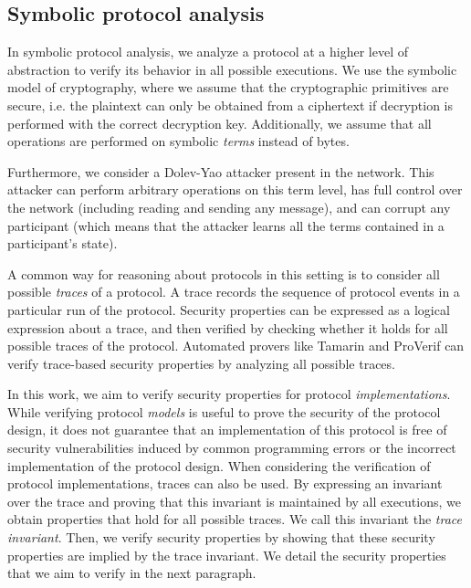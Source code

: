 \subsection{Symbolic protocol analysis}
\label{sec:symbolic-protocol-analysis}

In symbolic protocol analysis, we analyze a protocol at a higher level of abstraction to verify its behavior in all possible executions.
We use the symbolic model of cryptography, where we assume that the cryptographic primitives are secure, i.e. the plaintext can only be obtained from a ciphertext if decryption is performed with the correct decryption key.
Additionally, we assume that all operations are performed on symbolic \emph{terms} instead of bytes.%

Furthermore, we consider a Dolev-Yao\cite{} attacker present in the network. This attacker can perform arbitrary operations on this term level, has full control over the network (including reading and sending any message), and can corrupt any participant (which means that the attacker learns all the terms contained in a participant's state).

A common way for reasoning about protocols in this setting is to consider all possible \emph{traces} of a protocol.
A trace records the sequence of protocol events in a particular run of the protocol.
Security properties can be expressed as a logical expression about a trace, and then verified by checking whether it holds for all possible traces of the protocol.
Automated provers like Tamarin\cite{} and ProVerif\cite{} can verify trace-based security properties by analyzing all possible traces.

In this work, we aim to verify security properties for protocol \emph{implementations}.
While verifying protocol \emph{models} is useful to prove the security of the protocol design, it does not guarantee that an implementation of this protocol is free of security vulnerabilities induced by common programming errors or the incorrect implementation of the protocol design.
When considering the verification of protocol implementations, traces can also be used.
By expressing an invariant over the trace and proving that this invariant is maintained by all executions, we obtain properties that hold for all possible traces. 
We call this invariant the \emph{trace invariant}.
Then, we verify security properties by showing that these security properties are implied by the trace invariant.
We detail the security properties that we aim to verify in the next paragraph.

